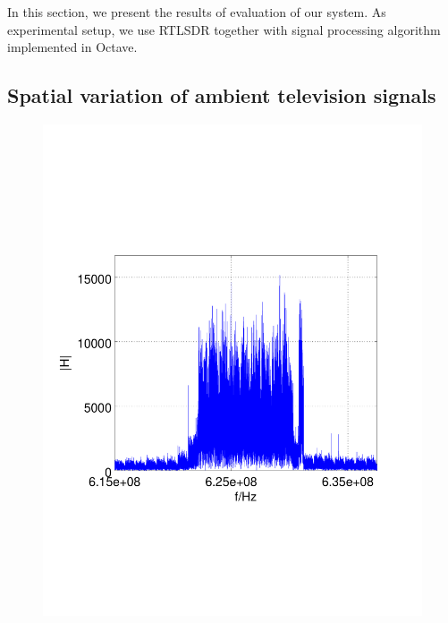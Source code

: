 
In this section, we present the results of evaluation of our system. As experimental 
setup, we use RTLSDR together with signal processing algorithm implemented
in Octave. 

\subsection{Spatial variation of ambient television signals}

\begin{figure}[h]
	\centering
	\begin{minipage}{0.49\columnwidth}
	\includegraphics[width=\columnwidth]{./fig/626mhz_raw}
	\end{minipage}
	\hfill
	\begin{minipage}{0.49\columnwidth}

\end{minipage}
\end{figure}
